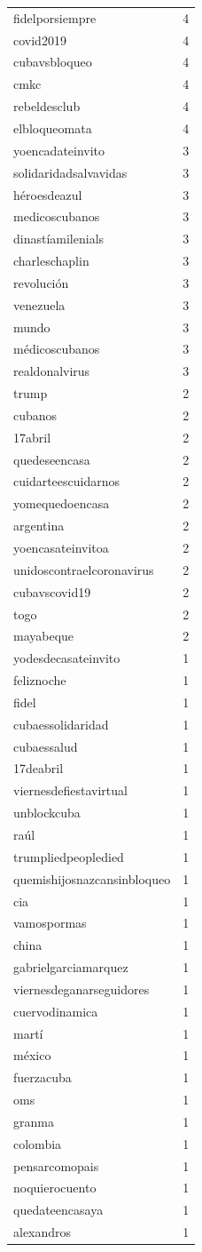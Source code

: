 \begin{tabular}{lr}
fidelporsiempre & 4 \\
covid2019 & 4 \\
cubavsbloqueo & 4 \\
cmkc & 4 \\
rebeldesclub & 4 \\
elbloqueomata & 4 \\
yoencadateinvito & 3 \\
solidaridadsalvavidas & 3 \\
héroesdeazul & 3 \\
medicoscubanos & 3 \\
dinastíamilenials & 3 \\
charleschaplin & 3 \\
revolución & 3 \\
venezuela & 3 \\
mundo & 3 \\
médicoscubanos & 3 \\
realdonalvirus & 3 \\
trump & 2 \\
cubanos & 2 \\
17abril & 2 \\
quedeseencasa & 2 \\
cuidarteescuidarnos & 2 \\
yomequedoencasa & 2 \\
argentina & 2 \\
yoencasateinvitoa & 2 \\
unidoscontraelcoronavirus & 2 \\
cubavscovid19 & 2 \\
togo & 2 \\
mayabeque & 2 \\
yodesdecasateinvito & 1 \\
feliznoche & 1 \\
fidel & 1 \\
cubaessolidaridad & 1 \\
cubaessalud & 1 \\
17deabril & 1 \\
viernesdefiestavirtual & 1 \\
unblockcuba & 1 \\
raúl & 1 \\
trumpliedpeopledied & 1 \\
quemishijosnazcansinbloqueo & 1 \\
cia & 1 \\
vamospormas & 1 \\
china & 1 \\
gabrielgarciamarquez & 1 \\
viernesdeganarseguidores & 1 \\
cuervodinamica & 1 \\
martí & 1 \\
méxico & 1 \\
fuerzacuba & 1 \\
oms & 1 \\
granma & 1 \\
colombia & 1 \\
pensarcomopais & 1 \\
noquierocuento & 1 \\
quedateencasaya & 1 \\
alexandros & 1 \\
\bottomrule
\end{tabular}
